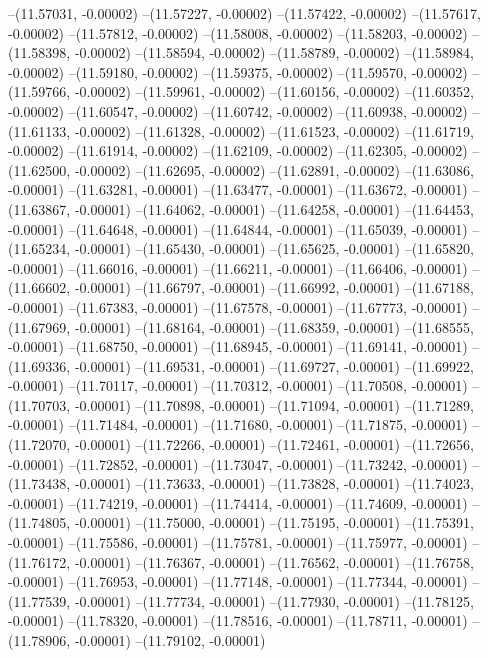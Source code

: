 --(11.57031, -0.00002)
--(11.57227, -0.00002)
--(11.57422, -0.00002)
--(11.57617, -0.00002)
--(11.57812, -0.00002)
--(11.58008, -0.00002)
--(11.58203, -0.00002)
--(11.58398, -0.00002)
--(11.58594, -0.00002)
--(11.58789, -0.00002)
--(11.58984, -0.00002)
--(11.59180, -0.00002)
--(11.59375, -0.00002)
--(11.59570, -0.00002)
--(11.59766, -0.00002)
--(11.59961, -0.00002)
--(11.60156, -0.00002)
--(11.60352, -0.00002)
--(11.60547, -0.00002)
--(11.60742, -0.00002)
--(11.60938, -0.00002)
--(11.61133, -0.00002)
--(11.61328, -0.00002)
--(11.61523, -0.00002)
--(11.61719, -0.00002)
--(11.61914, -0.00002)
--(11.62109, -0.00002)
--(11.62305, -0.00002)
--(11.62500, -0.00002)
--(11.62695, -0.00002)
--(11.62891, -0.00002)
--(11.63086, -0.00001)
--(11.63281, -0.00001)
--(11.63477, -0.00001)
--(11.63672, -0.00001)
--(11.63867, -0.00001)
--(11.64062, -0.00001)
--(11.64258, -0.00001)
--(11.64453, -0.00001)
--(11.64648, -0.00001)
--(11.64844, -0.00001)
--(11.65039, -0.00001)
--(11.65234, -0.00001)
--(11.65430, -0.00001)
--(11.65625, -0.00001)
--(11.65820, -0.00001)
--(11.66016, -0.00001)
--(11.66211, -0.00001)
--(11.66406, -0.00001)
--(11.66602, -0.00001)
--(11.66797, -0.00001)
--(11.66992, -0.00001)
--(11.67188, -0.00001)
--(11.67383, -0.00001)
--(11.67578, -0.00001)
--(11.67773, -0.00001)
--(11.67969, -0.00001)
--(11.68164, -0.00001)
--(11.68359, -0.00001)
--(11.68555, -0.00001)
--(11.68750, -0.00001)
--(11.68945, -0.00001)
--(11.69141, -0.00001)
--(11.69336, -0.00001)
--(11.69531, -0.00001)
--(11.69727, -0.00001)
--(11.69922, -0.00001)
--(11.70117, -0.00001)
--(11.70312, -0.00001)
--(11.70508, -0.00001)
--(11.70703, -0.00001)
--(11.70898, -0.00001)
--(11.71094, -0.00001)
--(11.71289, -0.00001)
--(11.71484, -0.00001)
--(11.71680, -0.00001)
--(11.71875, -0.00001)
--(11.72070, -0.00001)
--(11.72266, -0.00001)
--(11.72461, -0.00001)
--(11.72656, -0.00001)
--(11.72852, -0.00001)
--(11.73047, -0.00001)
--(11.73242, -0.00001)
--(11.73438, -0.00001)
--(11.73633, -0.00001)
--(11.73828, -0.00001)
--(11.74023, -0.00001)
--(11.74219, -0.00001)
--(11.74414, -0.00001)
--(11.74609, -0.00001)
--(11.74805, -0.00001)
--(11.75000, -0.00001)
--(11.75195, -0.00001)
--(11.75391, -0.00001)
--(11.75586, -0.00001)
--(11.75781, -0.00001)
--(11.75977, -0.00001)
--(11.76172, -0.00001)
--(11.76367, -0.00001)
--(11.76562, -0.00001)
--(11.76758, -0.00001)
--(11.76953, -0.00001)
--(11.77148, -0.00001)
--(11.77344, -0.00001)
--(11.77539, -0.00001)
--(11.77734, -0.00001)
--(11.77930, -0.00001)
--(11.78125, -0.00001)
--(11.78320, -0.00001)
--(11.78516, -0.00001)
--(11.78711, -0.00001)
--(11.78906, -0.00001)
--(11.79102, -0.00001)
